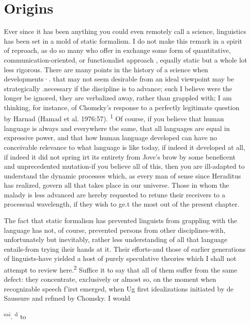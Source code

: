 
\chapter{Origins}

Ever since it has been anything you could even remotely call a science, linguistics has been set in a mold of static formalism. I do not make this remark in a spirit of reproach, as do so many who offer in exchange some form of quantitative, communication-oriented, or functionalist approach , equally static but a whole lot less rigorous. There are many points in the history of a science when developments·. that may not seem desirable from an ideal viewpoint may be strategi\-cally .necessary if the discipline is to advance; such I believe were the
longer be ignored, they are verbalized away, rather than grappled with; I am thinking, for instance, of Chomsky's response to a perfectly legitimate question by Harnad (Hamad et al. 1976:57). \textsuperscript{1} Of course, if you believe that human language is always and everywhere tbe same, that all languages are equal in expressive power, and that how human language developed can have no conceivable relevance to what language is like today, if indeed it developed at all, if indeed it did not spring irt its entirety from Jove's brow by some beneficent and unprecedented mutation-if you believe all of this, then you are ill-adapted to under\-stand the dynamic processes which, as every man of sense since Hera\-ditus has realized, govern all that takes place in our universe. Those in whom the malady is less advanced are hereby requested to retune their receivers to a processual wavelength, if they wish to ge.t the most out of the present chapter.

The fact that static formalism has prevented linguists from grappling with the  language has not, of course, prevented persons from other disciplines-with, unfortunately but inevitably, rather less understanding of all that language entails-from trying iheir hands at it. Their efforts-and those of earlier generations of linguists-have yielded a host of purely speculative theories which I shall not attempt to review here.\textsuperscript{2} Suffice it to say that all of them suffer from the same defect: they concentrate, exclusively or almost so, on the moment when recognizable speech f'irst emerged, when Ug first
idealizations initiated by de Saussure and refmed by Chomsky. I would

\textsuperscript{sa}\textsuperscript{i}. \textsuperscript{d} to

